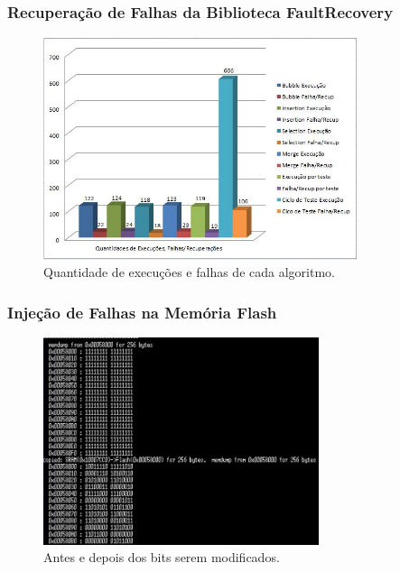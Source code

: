 \begin{frame}
	\frametitle{Recuperação de Falhas da Biblioteca FaultRecovery}
	\begin{figure}
		\begin{center}\includegraphics[width=0.82\textwidth]{./figuras/testeFaultRecovery.png}\end{center}
		\caption{Quantidade de execuções e falhas de cada algoritmo.}
	\end{figure}
\end{frame}

\begin{frame}
	\frametitle{Injeção de Falhas na Memória Flash}
	\begin{figure}
		\begin{center}\includegraphics[width=0.72\textwidth]{./figuras/injecaoFlash.png}\end{center}
		\caption{Antes e depois dos bits serem modificados.}
	\end{figure}
\end{frame}
